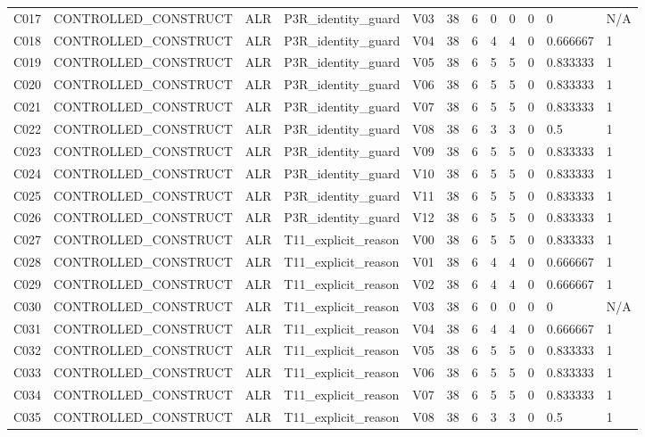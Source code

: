 \begin{longtable}{llllllllllll}
C017 & CONTROLLED\_CONSTRUCT & ALR & P3R\_identity\_guard & V03 & 38 & 6 & 0 & 0 & 0 & 0 & N/A \\
C018 & CONTROLLED\_CONSTRUCT & ALR & P3R\_identity\_guard & V04 & 38 & 6 & 4 & 4 & 0 & 0.666667 & 1 \\
C019 & CONTROLLED\_CONSTRUCT & ALR & P3R\_identity\_guard & V05 & 38 & 6 & 5 & 5 & 0 & 0.833333 & 1 \\
C020 & CONTROLLED\_CONSTRUCT & ALR & P3R\_identity\_guard & V06 & 38 & 6 & 5 & 5 & 0 & 0.833333 & 1 \\
C021 & CONTROLLED\_CONSTRUCT & ALR & P3R\_identity\_guard & V07 & 38 & 6 & 5 & 5 & 0 & 0.833333 & 1 \\
C022 & CONTROLLED\_CONSTRUCT & ALR & P3R\_identity\_guard & V08 & 38 & 6 & 3 & 3 & 0 & 0.5 & 1 \\
C023 & CONTROLLED\_CONSTRUCT & ALR & P3R\_identity\_guard & V09 & 38 & 6 & 5 & 5 & 0 & 0.833333 & 1 \\
C024 & CONTROLLED\_CONSTRUCT & ALR & P3R\_identity\_guard & V10 & 38 & 6 & 5 & 5 & 0 & 0.833333 & 1 \\
C025 & CONTROLLED\_CONSTRUCT & ALR & P3R\_identity\_guard & V11 & 38 & 6 & 5 & 5 & 0 & 0.833333 & 1 \\
C026 & CONTROLLED\_CONSTRUCT & ALR & P3R\_identity\_guard & V12 & 38 & 6 & 5 & 5 & 0 & 0.833333 & 1 \\
C027 & CONTROLLED\_CONSTRUCT & ALR & T11\_explicit\_reason & V00 & 38 & 6 & 5 & 5 & 0 & 0.833333 & 1 \\
C028 & CONTROLLED\_CONSTRUCT & ALR & T11\_explicit\_reason & V01 & 38 & 6 & 4 & 4 & 0 & 0.666667 & 1 \\
C029 & CONTROLLED\_CONSTRUCT & ALR & T11\_explicit\_reason & V02 & 38 & 6 & 4 & 4 & 0 & 0.666667 & 1 \\
C030 & CONTROLLED\_CONSTRUCT & ALR & T11\_explicit\_reason & V03 & 38 & 6 & 0 & 0 & 0 & 0 & N/A \\
C031 & CONTROLLED\_CONSTRUCT & ALR & T11\_explicit\_reason & V04 & 38 & 6 & 4 & 4 & 0 & 0.666667 & 1 \\
C032 & CONTROLLED\_CONSTRUCT & ALR & T11\_explicit\_reason & V05 & 38 & 6 & 5 & 5 & 0 & 0.833333 & 1 \\
C033 & CONTROLLED\_CONSTRUCT & ALR & T11\_explicit\_reason & V06 & 38 & 6 & 5 & 5 & 0 & 0.833333 & 1 \\
C034 & CONTROLLED\_CONSTRUCT & ALR & T11\_explicit\_reason & V07 & 38 & 6 & 5 & 5 & 0 & 0.833333 & 1 \\
C035 & CONTROLLED\_CONSTRUCT & ALR & T11\_explicit\_reason & V08 & 38 & 6 & 3 & 3 & 0 & 0.5 & 1 \\

\end{longtable}
